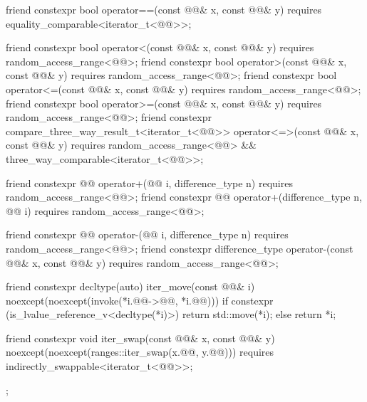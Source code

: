 \begin{codeblock}
{{    friend constexpr bool operator==(const @@& x, const @@& y)
      requires equality_comparable<iterator_t<@@>>;

    friend constexpr bool operator<(const @@& x, const @@& y)
      requires random_access_range<@@>;
    friend constexpr bool operator>(const @@& x, const @@& y)
      requires random_access_range<@@>;
    friend constexpr bool operator<=(const @@& x, const @@& y)
      requires random_access_range<@@>;
    friend constexpr bool operator>=(const @@& x, const @@& y)
      requires random_access_range<@@>;
    friend constexpr compare_three_way_result_t<iterator_t<@@>>
      operator<=>(const @@& x, const @@& y)
        requires random_access_range<@@> && three_way_comparable<iterator_t<@@>>;

    friend constexpr @@ operator+(@@ i, difference_type n)
      requires random_access_range<@@>;
    friend constexpr @@ operator+(difference_type n, @@ i)
      requires random_access_range<@@>;

    friend constexpr @@ operator-(@@ i, difference_type n)
      requires random_access_range<@@>;
    friend constexpr difference_type operator-(const @@& x, const @@& y)
      requires random_access_range<@@>;

    friend constexpr decltype(auto) iter_move(const @@& i)
      noexcept(noexcept(invoke(*i.@@->@@, *i.@@)))
    {
      if constexpr (is_lvalue_reference_v<decltype(*i)>)
        return std::move(*i);
      else
        return *i;
    }

    friend constexpr void iter_swap(const @@& x, const @@& y)
      noexcept(noexcept(ranges::iter_swap(x.@@, y.@@)))
      requires indirectly_swappable<iterator_t<@@>>;
  };
}
\end{codeblock}

